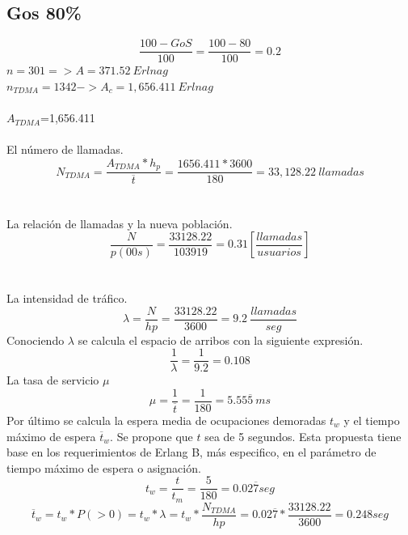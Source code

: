 \documentclass[11pt,letterpaper]{article}
\begin{document}
\subsection{Gos 80\%}
\begin{equation}
    \frac{100-GoS}{100}=\frac{100-80}{100}=0.2
\end{equation}
$n=301 => A=371.52 \ Erlnag$
\\ 
$n_{TDMA}=1342->A_c=1,656.411 \ Erlnag$
\\ \\
$A_{TDMA}$=1,656.411
\\ \\
El número de llamadas.
\begin{equation}
    N_{TDMA}=\frac{A_{TDMA}*h_p}{\overline{t}}=\frac{1656.411*3600}{180}=33,128.22 \ llamadas
\end{equation}
\\ \\
La relación de llamadas y la nueva población.
\begin{equation}
    \frac{N}{p(00s)}=\frac{33128.22}{103919}=0.31[\frac{llamadas}{usuarios}]
\end{equation}
\\ \\
La intensidad de tráfico.
\begin{equation}
    \lambda=\frac{N}{hp}=\frac{33128.22}{3600}=9.2 \ \frac{llamadas}{seg}
\end{equation}
Conociendo $\lambda$ se calcula el espacio de arribos con la siguiente expresión.
\begin{equation}
    \frac{1}{\lambda}=\frac{1}{9.2}=0.108 
\end{equation}
La tasa de servicio $\mu$
\begin{equation}
    \mu=\frac{1}{\overline{t}}=\frac{1}{180}=5.55\overline{5} \ ms
\end{equation}
Por último se calcula la espera media de ocupaciones demoradas $t_w$ y el tiempo máximo 
de espera $\overline{t}_w$. Se propone que $t$ sea de 5 segundos. Esta propuesta tiene base en los 
requerimientos de Erlang B, más especifico, en el parámetro de tiempo máximo de espera o 
asignación. 
\begin{equation}
    t_w=\frac{t}{t_m}=\frac{5}{180}=0.02\overline{7} seg
\end{equation}
\begin{equation}
    \overline{t}_w=t_w*P(>0)=t_w*\lambda=t_w*\frac{N_{TDMA}}{hp}=0.02\overline{7}*\frac{33128.22}{3600}=0.248seg
\end{equation}
\end{document}
